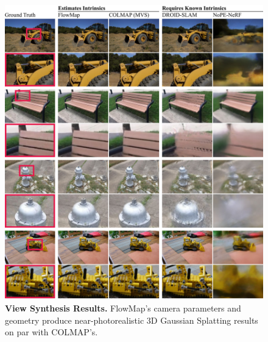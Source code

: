 \begin{figure}[t!]
    \centering
    \includegraphics[width=\linewidth]{figures/splat_comparison/fig_splat_comparison_pdf_compressed.pdf}
    \vspace{-15pt}
    \caption{\textbf{View Synthesis Results.} FlowMap's camera parameters and geometry produce near-photorealistic 3D Gaussian Splatting results on par with COLMAP's.}
    \label{fig:splat_comparison}
    \vspace{-5pt}
\end{figure}
